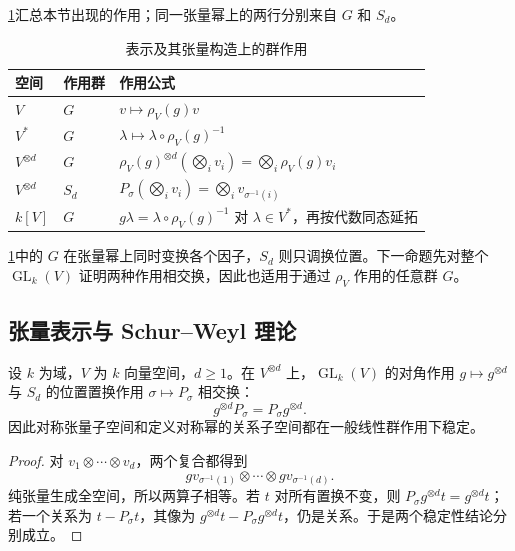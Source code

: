 \cref{b2:tab:08-group-actions}汇总本节出现的作用；同一张量幂上的两行分别来自 \(G\) 和 \(S_d\)。
\begin{table}[htbp]
	\centering
	\caption{表示及其张量构造上的群作用}\label{b2:tab:08-group-actions}
	\begin{tabularx}{\linewidth}{@{}l l X@{}}
		\toprule
		空间 & 作用群 & 作用公式 \\
		\midrule
		\(V\) & \(G\) & \(v\mapsto \rho_V(g)v\) \\
		\(V^*\) & \(G\) & \(\lambda\mapsto\lambda\circ\rho_V(g)^{-1}\) \\
		\(V^{\otimes d}\) & \(G\) & \(\rho_V(g)^{\otimes d}(\bigotimes_i v_i)=\bigotimes_i\rho_V(g)v_i\) \\
		\(V^{\otimes d}\) & \(S_d\) & \(P_\sigma(\bigotimes_i v_i)=\bigotimes_i v_{\sigma^{-1}(i)}\) \\
		\(k[V]\) & \(G\) & \(g\lambda=\lambda\circ\rho_V(g)^{-1}\) 对 \(\lambda\in V^*\)，再按代数同态延拓 \\
		\bottomrule
	\end{tabularx}
\end{table}
\cref{b2:tab:08-group-actions}中的 \(G\) 在张量幂上同时变换各个因子，\(S_d\) 则只调换位置。下一命题先对整个 \(\operatorname{GL}_k(V)\) 证明两种作用相交换，因此也适用于通过 \(\rho_V\) 作用的任意群 \(G\)。

\subsection{张量表示与 Schur–Weyl 理论}
\label{b2:subsec:0804:03}

\begin{proposition}\label{b2:prop:commuting-tensor-actions}
	设 \(k\) 为域，\(V\) 为 \(k\) 向量空间，\(d\ge1\)。在 \(V^{\otimes d}\) 上，\(\operatorname{GL}_k(V)\) 的对角作用 \(g\mapsto g^{\otimes d}\) 与 \(S_d\) 的位置置换作用 \(\sigma\mapsto P_\sigma\) 相交换：
	\[
		g^{\otimes d}P_\sigma=P_\sigma g^{\otimes d}.
	\]
	因此对称张量子空间和定义对称幂的关系子空间都在一般线性群作用下稳定。
\end{proposition}
\begin{proof}
	对 \(v_1\otimes\cdots\otimes v_d\)，两个复合都得到
	\[
		gv_{\sigma^{-1}(1)}\otimes\cdots\otimes gv_{\sigma^{-1}(d)}.
	\]
	纯张量生成全空间，所以两算子相等。若 \(t\) 对所有置换不变，则 \(P_\sigma g^{\otimes d}t=g^{\otimes d}t\)；若一个关系为 \(t-P_\sigma t\)，其像为 \(g^{\otimes d}t-P_\sigma g^{\otimes d}t\)，仍是关系。于是两个稳定性结论分别成立。
\end{proof}

